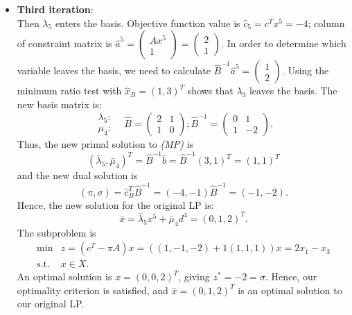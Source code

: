 \begin{itemize}
\newpage
  \item {\bf Third iteration}: \\
     Then $\lambda_5$ enters the basis.
     Objective function value is $\hat{c}_5=c^Tx^5=-4$;
     column of constraint matrix is
       $\hat{a}^5=\left(\begin{array}{r}Ax^5\\1\end{array}\right)=
          \left(\begin{array}{r}2\\1\end{array}\right)$.
     In order to determine which variable leaves the basis,
     we need to calculate
       $\hat{B}^{-1} \hat{a}^5 = \left(\begin{array}{r}1\\2\end{array}\right)$.
     Using the minimum ratio test with $\hat{x}_B=(1,3)^T$ shows that
     $\lambda_3$ leaves the basis.
     The new basis matrix is:
     \begin{displaymath}
       \begin{array}{c}\lambda_5: \\ \mu_4: \end{array} \;\;\;
       \hat{B} = \left(\begin{array}{rr}2&1\\1&0\end{array}\right);
        \hat{B}^{-1} = \left(\begin{array}{rr}0&1\\1&-2\end{array}\right).
     \end{displaymath}
     Thus, the new primal solution to {\em (MP)} is
     \begin{displaymath}
      (\bar{\lambda}_5,\bar{\mu}_4)^T =
       \hat{B}^{-1} \hat{b} = \hat{B}^{-1} (3,1)^T = (1,1)^T
     \end{displaymath}
     and the new dual solution is
     \begin{displaymath}
       (\pi,\sigma) = \hat{c}^T_B \hat{B}^{-1} = (-4,-1) \hat{B}^{-1} = (-1,-2).
     \end{displaymath}
     Hence, the new solution for the original LP is:
     \begin{displaymath}
       \bar{x} = \bar{\lambda}_5 x^5 + \bar{\mu}_4 d^4 = (0,1,2)^T.
     \end{displaymath}
     The subproblem is
     \begin{displaymath}
       \begin{array}{lc}
       \min & z = (c^T - \pi A) x = ((1,-1,-2)+1(1,1,1))x=2x_1-x_3 \\
          \mbox{s.t. }  & x \in X.
       \end{array}
     \end{displaymath}
     An optimal solution is $x=(0,0,2)^T$, giving $z^*=-2=\sigma$.
     Hence, our optimality criterion is satisfied,
     and $\bar{x}=(0,1,2)^T$ is an optimal solution to our original LP.
\end{itemize}





